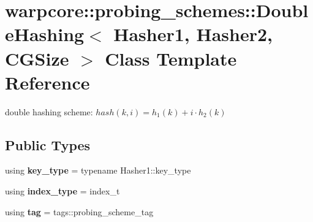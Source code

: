 \hypertarget{classwarpcore_1_1probing__schemes_1_1DoubleHashing}{}\section{warpcore\+:\+:probing\+\_\+schemes\+:\+:Double\+Hashing$<$ Hasher1, Hasher2, C\+G\+Size $>$ Class Template Reference}
\label{classwarpcore_1_1probing__schemes_1_1DoubleHashing}


double hashing scheme\+: $hash(k,i) = h_1(k)+i\cdot h_2(k)$  


\subsection*{Public Types}
\begin{DoxyCompactItemize}
\item 
\mbox{\label{classwarpcore_1_1probing__schemes_1_1DoubleHashing_a7717ccd60167090680b7049a3ea59645}} 
using {\bfseries key\+\_\+type} = typename Hasher1\+::key\+\_\+type
\item 
\mbox{\label{classwarpcore_1_1probing__schemes_1_1DoubleHashing_a806df26c5d213788a298771b746788a5}} 
using {\bfseries index\+\_\+type} = index\+\_\+t
\item 
\mbox{\label{classwarpcore_1_1probing__schemes_1_1DoubleHashing_a3fb4fb42e3e21599e2a1909cd0df5e37}} 
using {\bfseries tag} = tags\+::probing\+\_\+scheme\+\_\+tag
\end{DoxyCompactItemize}
